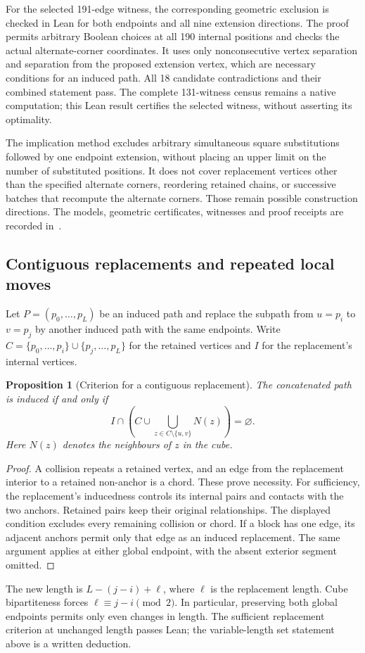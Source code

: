 \documentclass[11pt,a4paper]{article}
\newtheorem{proposition}[theorem]{Proposition}
\theoremstyle{definition}
\theoremstyle{remark}
\begin{document}
For the selected 191-edge witness, the corresponding geometric
exclusion is checked in Lean for both endpoints and all nine extension
directions. The proof permits arbitrary Boolean choices at all 190
internal positions and checks the actual alternate-corner coordinates.
It uses only nonconsecutive vertex separation and separation from the
proposed extension vertex, which are necessary conditions for an induced
path. All 18 candidate contradictions and their combined statement pass.
The complete 131-witness census remains a native computation; this Lean
result certifies the selected witness, without asserting its optimality.


The implication method excludes arbitrary simultaneous square
substitutions followed by one endpoint extension, without placing an
upper limit on the number of substituted positions. It does not cover
replacement vertices other than the specified alternate corners,
reordering retained chains, or successive batches that recompute the
alternate corners. Those remain possible construction directions.
The models, geometric certificates, witnesses and proof receipts are
recorded in~\cite{moving192archive}.



\subsection{Contiguous replacements and repeated local moves}
\label{sec:block193}
Let $P=(p_0,\ldots,p_L)$ be an induced path and replace the subpath
from $u=p_i$ to $v=p_j$ by another induced path with the same endpoints.
Write $C=\{p_0,\ldots,p_i\}\cup\{p_j,\ldots,p_L\}$ for the retained
vertices and $I$ for the replacement's internal vertices.

\begin{proposition}[Criterion for a contiguous replacement]
The concatenated path is induced if and only if
\[
I\cap\left(C\cup\bigcup_{z\in C\setminus\{u,v\}}N(z)\right)=\varnothing.
\]
Here $N(z)$ denotes the neighbours of $z$ in the cube.
\end{proposition}
\begin{proof}
A collision repeats a retained vertex, and an edge from the replacement
interior to a retained non-anchor is a chord. These prove necessity.
For sufficiency, the replacement's inducedness controls its internal
pairs and contacts with the two anchors. Retained pairs keep their
original relationships. The displayed condition excludes every remaining
collision or chord. If a block has one edge, its adjacent anchors
permit only that edge as an induced replacement. The same argument
applies at either global endpoint, with the absent exterior segment omitted.
\end{proof}
The new length is $L-(j-i)+\ell$, where $\ell$ is the replacement length.
Cube bipartiteness forces $\ell\equiv j-i\pmod 2$. In particular,
preserving both global endpoints permits only even changes in length.
The sufficient replacement criterion at unchanged length passes Lean;
the variable-length set statement above is a written deduction.
\end{document}
